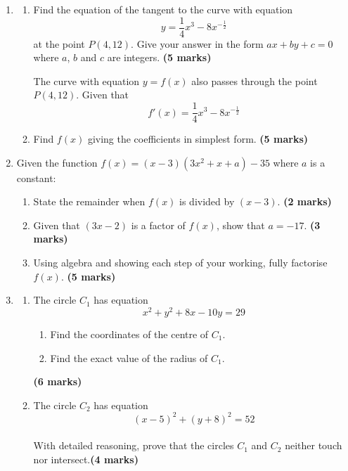 \documentclass{../Templates/sbs-exam}
\newcommand{\imarks}[1]{\hfill \textbf{(#1 marks)}}
\begin{document}
\begin{enumerate}

\item %
\begin{enumerate}
        \item[(a)] Find the equation of the tangent to the curve with equation
        \[
        y = \frac{1}{4}x^3 - 8x^{-\frac{1}{2}}
        \]
        at the point \( P(4, 12) \). Give your answer in the form \( ax + by + c = 0 \) where \( a \), \( b \) and \( c \) are integers. \imarks{5}
        
        The curve with equation \( y = f(x) \) also passes through the point \( P(4, 12) \). Given that
        \[
        f'(x) = \frac{1}{4}x^3 - 8x^{-\frac{1}{2}}
        \]
        
        \item[(b)] Find \( f(x) \) giving the coefficients in simplest form. \imarks{5}
    \end{enumerate}

\vspace{8cm}

\item %

Given the function \( f(x) = (x - 3)(3x^2 + x + a) - 35 \) where \( a \) is a constant:
          \begin{enumerate}
              \item State the remainder when \( f(x) \) is divided by \( (x - 3) \). \imarks{2}
              \item Given that \( (3x - 2) \) is a factor of \( f(x) \), show that \( a = -17 \). \imarks{3}
              \item Using algebra and showing each step of your working, fully factorise \( f(x) \). \imarks{5}
          \end{enumerate}

\vspace{8cm}

\item %
\begin{enumerate}
    \item The circle \(C_1\) has equation
    \[
    x^2 + y^2 + 8x - 10y = 29
    \]
    \begin{enumerate}
        \item[(i)] Find the coordinates of the centre of \(C_1\).
        \item[(ii)] Find the exact value of the radius of \(C_1\).
    \end{enumerate}\imarks{6}
    \item[(b)] The circle \(C_2\) has equation
    \[
    (x - 5)^2 + (y + 8)^2 = 52
    \]\\
    With detailed reasoning, prove that the circles \(C_1\) and \(C_2\) neither touch nor intersect.\imarks{4}
\end{enumerate}


\end{enumerate}
\end{document}
